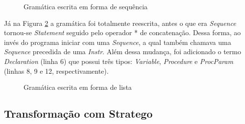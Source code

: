 \begin{figure}[h]

\caption{Gramática escrita em forma de sequência}
\label{fig:gramatica_antes}
\end{figure}

Já na Figura \ref{fig:gramatica} a gramática foi totalmente reescrita, antes o que era \textit{Sequence} tornou-se \textit{Statement} seguido pelo operador * de concatenação. Dessa forma, ao invés do programa iniciar com uma \textit{Sequence}, a qual também chamava uma \textit{Sequence} precedida de uma \textit{Instr}. Além dessa mudança, foi adicionado o termo \textit{Declaration} (linha 6) que possui três tipos: \textit{Variable}, \textit{Procedure} e \textit{ProcParam} (linhas 8, 9 e 12, respectivamente).

\begin{figure}[h]

\caption{Gramática escrita em forma de lista}
\label{fig:gramatica}
\end{figure}

\subsection{Transformação com Stratego}

